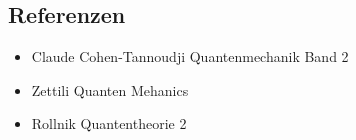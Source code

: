 \subsection*{Referenzen}
\begin{itemize}
\item Claude Cohen-Tannoudji Quantenmechanik Band 2
\item Zettili Quanten Mehanics
\item Rollnik Quantentheorie 2
\end{itemize}


